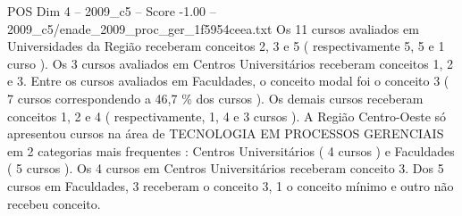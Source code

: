 \begin{textsample}{POS Dim 4 – 2009\_c5 – Score -1.00 – 2009\_c5/enade\_2009\_proc\_ger\_1f5954ceea.txt}
Os 11 cursos avaliados em Universidades da Região receberam conceitos 2, 3 e 5 ( respectivamente 5, 5 e 1 curso ).
Os 3 cursos avaliados em Centros Universitários receberam conceitos 1, 2 e 3.
Entre os cursos avaliados em Faculdades, o conceito modal foi o conceito 3 ( 7 cursos correspondendo a 46,7 \% dos cursos ).
Os demais cursos receberam conceitos 1, 2 e 4 ( respectivamente, 1, 4 e 3 cursos ).
A Região Centro-Oeste só apresentou cursos na área de TECNOLOGIA EM PROCESSOS GERENCIAIS em 2 categorias mais frequentes : Centros Universitários ( 4 cursos ) e Faculdades ( 5 cursos ).
Os 4 cursos em Centros Universitários receberam conceito 3.
Dos 5 cursos em Faculdades, 3 receberam o conceito 3, 1 o conceito mínimo e outro não recebeu conceito.

\end{textsample}
